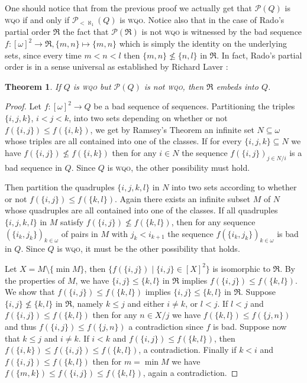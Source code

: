 \documentclass{article}%
\theoremstyle{plain}
\newtheorem{theorem}{Theorem}
\newtheorem{theorem}{Theorem}[section]
\theoremstyle{definition}
\theoremstyle{remark}
\newcommand{\wqo}{\textsc{wqo}}
\newcommand{\CtblSubs}{\mathcal{P}_{<\aleph_{1}}}
\newcommand{\Rado}{\mathfrak{R}}
\begin{document}
One should notice that from the previous proof we actually get that $\mathcal{P}(Q)$ is \wqo{} if and only if $\CtblSubs(Q)$ is \wqo{}.  Notice also that in the case of Rado's partial order $\Rado$ the fact that $\mathcal{P}(\Rado)$ is not \wqo{} is witnessed by the bad sequence $f:[\omega]^{2}\to\Rado, \{m,n\}\mapsto \{m,n\}$ which is simply the identity on the underlying sets, since every time $m<n<l$ then $\{m,n\}\nleq \{n,l\}$ in $\Rado$. In fact, Rado's partial order is in a sense universal as established by Richard Laver \cite{laver1976well}: 

\begin{theorem}
If $Q$ is \wqo{} but $\mathcal{P}(Q)$ is not \wqo{}, then $\Rado$ embeds into $Q$.
\end{theorem}
\begin{proof}
Let $f:[\omega]^{2}\to Q$ be a bad sequence of sequences. Partitioning the triples $\{i,j,k\}$, $i<j<k$, into two sets depending on whether or not $f(\{i,j\})\leq f(\{i,k\})$, we get by Ramsey's Theorem an infinite set $N\subseteq\omega$ whose triples are all contained into one of the classes. If for every $\{i,j,k\}\subseteq N$ we have $f(\{i,j\})\nleq f(\{i,k\})$ then for any $i\in N$ the sequence $f(\{i,j\})_{j\in N/i}$ is a bad sequence in $Q$. Since $Q$ is \wqo{}, the other possibility must hold. 

Then partition the quadruples $\{i,j,k,l\}$ in $N$ into two sets according to whether or not $f(\{i,j\})\leq f(\{k,l\})$. Again there exists an infinite subset $M$ of $N$ whose quadruples are all contained into one of the classes. If all quadruples $\{i,j,k,l\}$ in $M$ satisfy $f(\{i,j\})\nleq f(\{k,l\})$, then for any sequence $(\{i_{k},j_{k}\})_{k\in\omega}$ of pairs in $M$ with $j_{k}<i_{k+1}$ the sequence $f(\{i_{k},j_{k}\})_{k\in\omega}$ is bad in $Q$. Since $Q$ is \wqo{}, it must be the other possibility that holds. 

Let $X=M\setminus \{\min M\}$, then $\{f(\{i,j\})\mid \{i,j\}\in [X]^{2}\}$ is isomorphic to $\Rado$. By the properties of $M$, we have $\{i,j\}\leq\{k,l\}$ in $\Rado$ implies $f(\{i,j\})\leq f(\{k,l\})$. We show that $f(\{i,j\}) \leq f(\{k,l\})$ implies $\{i,j\}\leq \{k,l\}$ in $\Rado$. Suppose $\{i,j\}\nleq \{k,l\}$ in $\Rado$, namely $k\leq j$ and either $i\neq k$, or $l< j$. If $l<j$ and $f(\{i,j\})\leq f(\{k,l\})$ then for any $n\in X/j$ we have $f(\{k,l\})\leq f(\{j,n\})$ and thus $f(\{i,j\})\leq f(\{j,n\})$ a contradiction since $f$ is bad. Suppose now that $k\leq j$ and $i\neq k$. If $i<k$ and $f(\{i,j\})\leq f(\{k,l\})$, then $f(\{i,k\})\leq f(\{i,j\})\leq f(\{k,l\})$, a contradiction. Finally if $k<i$ and $f(\{i,j\})\leq f(\{k,l\})$ then for $m=\min M$ we have $f(\{m,k\})\leq f(\{i,j\})\leq f(\{k,l\})$, again a contradiction.
\end{proof}
\end{document}
